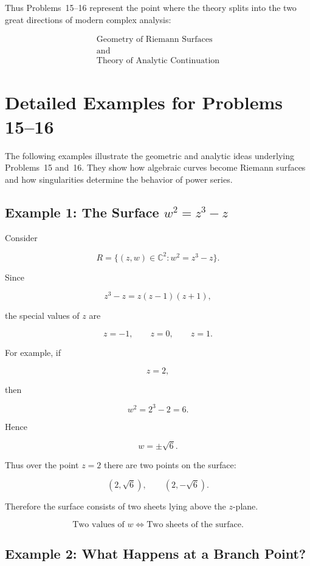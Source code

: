 \documentclass[12pt,a4paper]{article}
\theoremstyle{notespace}
\begin{document}
Thus Problems~15--16 represent the point where the theory splits into the two great directions of modern complex analysis:

\[
\boxed{
	\begin{gathered}
		\text{Geometry of Riemann Surfaces}\\[0.5ex]
		\text{and}\\[0.5ex]
		\text{Theory of Analytic Continuation}
	\end{gathered}
}
\]


\section{Detailed Examples for Problems 15--16}

The following examples illustrate the geometric and analytic ideas underlying Problems~15 and~16. They show how algebraic curves become Riemann surfaces and how singularities determine the behavior of power series.

\bigskip

\subsection{Example 1: The Surface \texorpdfstring{$w^2=z^3-z$}{w²=z³-z}}

Consider

\[
R
=
\{(z,w)\in\mathbb C^2:w^2=z^3-z\}.
\]

Since

\[
z^3-z
=
z(z-1)(z+1),
\]

the special values of \(z\) are

\[
z=-1,\qquad z=0,\qquad z=1.
\]

For example, if

\[
z=2,
\]

then

\[
w^2=2^3-2=6.
\]

Hence

\[
w=\pm\sqrt6.
\]

Thus over the point \(z=2\) there are two points on the surface:

\[
(2,\sqrt6),
\qquad
(2,-\sqrt6).
\]

Therefore the surface consists of two sheets lying above the \(z\)-plane.

\[
\boxed{
	\text{Two values of }w
	\Longleftrightarrow
	\text{Two sheets of the surface}.
}
\]

\bigskip

\subsection{Example 2: What Happens at a Branch Point?}
\end{document}
